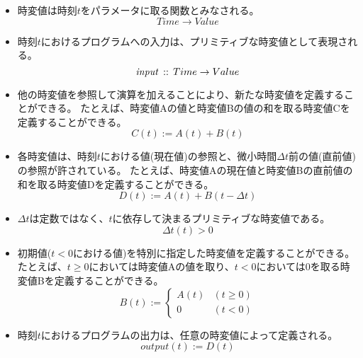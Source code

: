 \begin{itemize}
  \item
  時変値は時刻$t$をパラメータに取る関数とみなされる。
  \begin{equation*}
    Time \rightarrow Value
  \end{equation*}

  \item
  時刻$t$におけるプログラムへの入力は、プリミティブな時変値として表現される。
  \begin{equation*}
    {\it input} \, :: \, Time \rightarrow Value
  \end{equation*}

  \item
  他の時変値を参照して演算を加えることにより、新たな時変値を定義することができる。
  たとえば、時変値Aの値と時変値Bの値の和を取る時変値Cを定義することができる。
  \begin{equation*}
    C(t) := A(t) + B(t)
  \end{equation*}

  \item
  各時変値は、時刻$t$における値(現在値)の参照と、微小時間$ \Delta t $前の値(直前値)の参照が許されている。
  たとえば、時変値Aの現在値と時変値Bの直前値の和を取る時変値Dを定義することができる。
  \begin{equation*}
    D(t) := A(t) + B(t - \Delta t)
  \end{equation*}

  \item
  $ \Delta t $は定数ではなく、$t$に依存して決まるプリミティブな時変値である。
  \begin{equation*}
    \Delta t(t) > 0
  \end{equation*}

  \item
  初期値($ t < 0 $における値)を特別に指定した時変値を定義することができる。
  たとえば、$t \geq 0$においては時変値Aの値を取り、$t < 0$においては0を取る時変値Bを定義することができる。
  \begin{equation*}
    B(t) := \begin{cases}
      A(t) & (t \geq 0) \\
      0 & (t < 0)
    \end{cases}
  \end{equation*}

  \item
  時刻$t$におけるプログラムの出力は、任意の時変値によって定義される。
  \begin{equation*}
    output(t) := D(t)
  \end{equation*}
\end{itemize}

